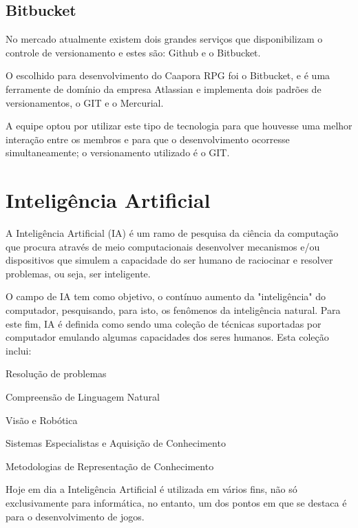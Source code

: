 	\subsection{Bitbucket}
	
No mercado atualmente existem dois grandes serviços que disponibilizam o controle de versionamento e estes são: Github e o Bitbucket.

O escolhido para desenvolvimento do Caapora RPG foi o Bitbucket, e é uma ferramente de domínio da empresa Atlassian e implementa dois padrões de versionamentos, o GIT e o Mercurial.


A equipe optou por utilizar este tipo de tecnologia para que houvesse uma melhor interação entre os membros e para que o desenvolvimento ocorresse simultaneamente; o
versionamento utilizado é o GIT. \cite{bit}

\section{Inteligência Artificial}
\label{sec:inteligencia-artificial}

A Inteligência Artificial (IA) é um ramo de pesquisa da ciência da computação que procura através de meio computacionais desenvolver mecanismos e/ou dispositivos que simulem a capacidade do ser humano de raciocinar e resolver problemas, ou seja, ser inteligente. 

O campo de IA tem como objetivo, o contínuo aumento da "inteligência"  do computador, pesquisando, para isto, os fenômenos da inteligência natural. Para este fim, IA é definida  como sendo uma coleção de técnicas suportadas por computador emulando algumas capacidades dos seres humanos. Esta coleção inclui:

\begin{alineascomponto}
	
   \item Resolução de problemas
   \item Compreensão de Linguagem Natural
   \item Visão e Robótica
   \item Sistemas Especialistas e Aquisição de Conhecimento
   \item Metodologias de Representação de Conhecimento

	\end{alineascomponto}
	
Hoje em dia a Inteligência Artificial é utilizada em vários fins, não só exclusivamente para informática, no entanto, um dos pontos em que se destaca é para o desenvolvimento de jogos. 


